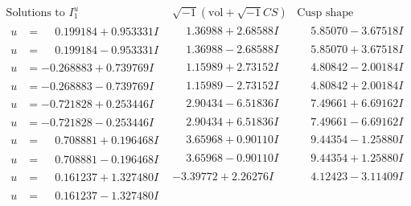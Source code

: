 \documentclass[1p]{elsarticle_modified}
\theoremstyle{definition}
\newcommand{\I}{\sqrt{-1}}
\begin{document}
$$\begin{array}{c|c|c}  
\text{Solutions to }I^u_{1}& \I (\text{vol} + \sqrt{-1}CS) & \text{Cusp shape}\\
 \hline 
\begin{aligned}
u &= \phantom{-}0.199184 + 0.953331 I\end{aligned}
 & \phantom{-}1.36988 + 2.68588 I & \phantom{-}5.85070 - 3.67518 I \\ \hline\begin{aligned}
u &= \phantom{-}0.199184 - 0.953331 I\end{aligned}
 & \phantom{-}1.36988 - 2.68588 I & \phantom{-}5.85070 + 3.67518 I \\ \hline\begin{aligned}
u &= -0.268883 + 0.739769 I\end{aligned}
 & \phantom{-}1.15989 + 2.73152 I & \phantom{-}4.80842 - 2.00184 I \\ \hline\begin{aligned}
u &= -0.268883 - 0.739769 I\end{aligned}
 & \phantom{-}1.15989 - 2.73152 I & \phantom{-}4.80842 + 2.00184 I \\ \hline\begin{aligned}
u &= -0.721828 + 0.253446 I\end{aligned}
 & \phantom{-}2.90434 - 6.51836 I & \phantom{-}7.49661 + 6.69162 I \\ \hline\begin{aligned}
u &= -0.721828 - 0.253446 I\end{aligned}
 & \phantom{-}2.90434 + 6.51836 I & \phantom{-}7.49661 - 6.69162 I \\ \hline\begin{aligned}
u &= \phantom{-}0.708881 + 0.196468 I\end{aligned}
 & \phantom{-}3.65968 + 0.90110 I & \phantom{-}9.44354 - 1.25880 I \\ \hline\begin{aligned}
u &= \phantom{-}0.708881 - 0.196468 I\end{aligned}
 & \phantom{-}3.65968 - 0.90110 I & \phantom{-}9.44354 + 1.25880 I \\ \hline\begin{aligned}
u &= \phantom{-}0.161237 + 1.327480 I\end{aligned}
 & -3.39772 + 2.26276 I & \phantom{-}4.12423 - 3.11409 I \\ \hline\begin{aligned}
u &= \phantom{-}0.161237 - 1.327480 I\end{aligned}

\end{array}$$
\end{document}
